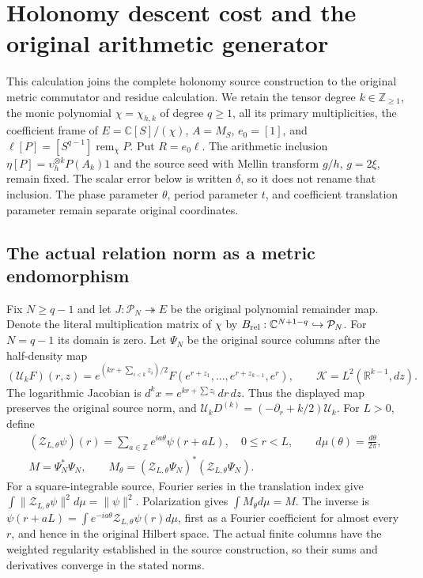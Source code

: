 \documentclass{article}
\begin{document}
\maketitle
\section{Holonomy descent cost and the original arithmetic generator}
\label{sec:holonomy-generator-control}

This calculation joins the complete holonomy source construction to the
original metric commutator and residue calculation. We retain the tensor
degree $k\in\mathbb Z_{\ge1}$, the monic polynomial $\chi=\chi_{h,k}$ of
degree $q\ge1$, all its primary multiplicities, the coefficient frame of
$E=\mathbb C[S]/(\chi)$, $A=M_S$, $e_0=[1]$, and
$\ell[P]=[S^{q-1}]\operatorname{rem}_{\chi}P$. Put $R=e_0\ell$.
The arithmetic inclusion $\eta[P]=\upsilon_h^{\otimes k}P(A_k)1$ and
the source seed with Mellin transform $g/h$, $g=2\xi$, remain fixed.
The scalar error below is written $\delta$, so it does not rename that
inclusion. The phase parameter $\theta$, period parameter $t$, and
coefficient translation parameter remain separate original coordinates.

\subsection{The actual relation norm as a metric endomorphism}

Fix $N\ge q-1$ and let $J:\mathcal P_N\twoheadrightarrow E$ be the
original polynomial remainder map. Denote the literal multiplication
matrix of $\chi$ by $B_{\rm rel}:\mathbb C^{N+1-q}\hookrightarrow
\mathcal P_N$. For $N=q-1$ its domain is zero. Let $\Psi_N$ be the
original source columns after the half-density map
\[
 (\mathcal U_k F)(r,z)=e^{(kr+\sum_{i<k}z_i)/2}
 F(e^{r+z_1},\ldots,e^{r+z_{k-1}},e^r),\qquad
 \mathcal K=L^2(\mathbb R^{k-1},dz).
 \tag{HG1}
\]
The logarithmic Jacobian is $d^kx=e^{kr+\sum z_i}\,dr\,dz$.
Thus the displayed map preserves the original source norm, and
$\mathcal U_kD^{(k)}=(-\partial_r+k/2)\mathcal U_k$.
For $L>0$, define
\[
\begin{gathered}
 (\mathcal Z_{L,\theta}\psi)(r)=
       \sum_{a\in\mathbb Z}e^{ia\theta}\psi(r+aL),\quad 0\le r<L,
 \qquad d\mu(\theta)=\frac{d\theta}{2\pi},\\
 M=\Psi_N^*\Psi_N,\qquad
 M_\theta=(\mathcal Z_{L,\theta}\Psi_N)^*
                    (\mathcal Z_{L,\theta}\Psi_N).
\end{gathered}\tag{HG2}
\]
For a square-integrable source, Fourier series in the translation index
give $\int\|\mathcal Z_{L,\theta}\psi\|^2d\mu=\|\psi\|^2$.
Polarization gives $\int M_\theta d\mu=M$. The inverse is
$\psi(r+aL)=\int e^{-ia\theta}\mathcal Z_{L,\theta}\psi(r)d\mu$,
first as a Fourier coefficient for almost every $r$, and hence in the
original Hilbert space. The actual finite columns have the weighted
regularity established in the source construction, so their sums and
derivatives converge in the stated norms.
\end{document}
